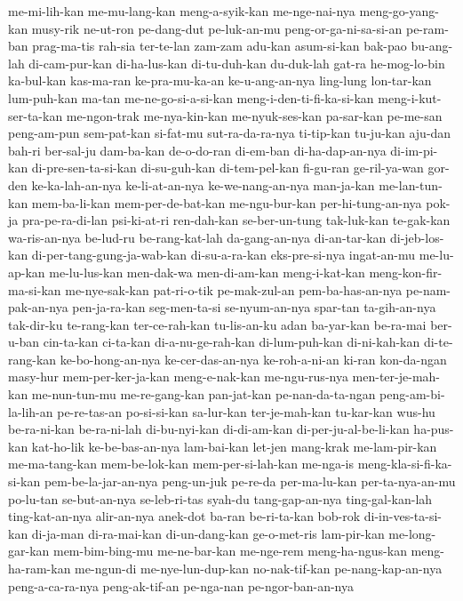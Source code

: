 {me-mi-lih-kan me-mu-lang-kan meng-a-syik-kan me-nge-nai-nya meng-go-yang-kan musy-rik ne-ut-ron pe-dang-dut
pe-luk-an-mu peng-or-ga-ni-sa-si-an pe-ram-ban prag-ma-tis rah-sia ter-te-lan zam-zam adu-kan
asum-si-kan bak-pao bu-ang-lah di-cam-pur-kan di-ha-lus-kan di-tu-duh-kan du-duk-lah gat-ra
he-mog-lo-bin ka-bul-kan kas-ma-ran ke-pra-mu-ka-an ke-u-ang-an-nya ling-lung lon-tar-kan lum-puh-kan
ma-tan me-ne-go-si-a-si-kan meng-i-den-ti-fi-ka-si-kan meng-i-kut-ser-ta-kan me-ngon-trak me-nya-kin-kan me-nyuk-ses-kan pa-sar-kan
pe-me-san peng-am-pun sem-pat-kan si-fat-mu sut-ra-da-ra-nya ti-tip-kan tu-ju-kan aju-dan
bah-ri ber-sal-ju dam-ba-kan de-o-do-ran di-em-ban di-ha-dap-an-nya di-im-pi-kan di-pre-sen-ta-si-kan
di-su-guh-kan di-tem-pel-kan fi-gu-ran ge-ril-ya-wan gor-den ke-ka-lah-an-nya ke-li-at-an-nya ke-we-nang-an-nya
man-ja-kan me-lan-tun-kan mem-ba-li-kan mem-per-de-bat-kan me-ngu-bur-kan per-hi-tung-an-nya pok-ja pra-pe-ra-di-lan
psi-ki-at-ri ren-dah-kan se-ber-un-tung tak-luk-kan te-gak-kan wa-ris-an-nya be-lud-ru be-rang-kat-lah
da-gang-an-nya di-an-tar-kan di-jeb-los-kan di-per-tang-gung-ja-wab-kan di-su-a-ra-kan eks-pre-si-nya ingat-an-mu me-lu-ap-kan
me-lu-lus-kan men-dak-wa men-di-am-kan meng-i-kat-kan meng-kon-fir-ma-si-kan me-nye-sak-kan pat-ri-o-tik pe-mak-zul-an
pem-ba-has-an-nya pe-nam-pak-an-nya pen-ja-ra-kan seg-men-ta-si se-nyum-an-nya spar-tan ta-gih-an-nya tak-dir-ku
te-rang-kan ter-ce-rah-kan tu-lis-an-ku adan ba-yar-kan be-ra-mai ber-u-ban cin-ta-kan
ci-ta-kan di-a-nu-ge-rah-kan di-lum-puh-kan di-ni-kah-kan di-te-rang-kan ke-bo-hong-an-nya ke-cer-das-an-nya ke-roh-a-ni-an
ki-ran kon-da-ngan masy-hur mem-per-ker-ja-kan meng-e-nak-kan me-ngu-rus-nya men-ter-je-mah-kan me-nun-tun-mu
me-re-gang-kan pan-jat-kan pe-nan-da-ta-ngan peng-am-bi-la-lih-an pe-re-tas-an po-si-si-kan sa-lur-kan ter-je-mah-kan
tu-kar-kan wus-hu be-ra-ni-kan be-ra-ni-lah di-bu-nyi-kan di-di-am-kan di-per-ju-al-be-li-kan ha-pus-kan
kat-ho-lik ke-be-bas-an-nya lam-bai-kan let-jen mang-krak me-lam-pir-kan me-ma-tang-kan mem-be-lok-kan
mem-per-si-lah-kan me-nga-is meng-kla-si-fi-ka-si-kan pem-be-la-jar-an-nya peng-un-juk pe-re-da per-ma-lu-kan per-ta-nya-an-mu
po-lu-tan se-but-an-nya se-leb-ri-tas syah-du tang-gap-an-nya ting-gal-kan-lah ting-kat-an-nya alir-an-nya
anek-dot ba-ran be-ri-ta-kan bob-rok di-in-ves-ta-si-kan di-ja-man di-ra-mai-kan di-un-dang-kan
ge-o-met-ris lam-pir-kan me-long-gar-kan mem-bim-bing-mu me-ne-bar-kan me-nge-rem meng-ha-ngus-kan meng-ha-ram-kan
me-ngun-di me-nye-lun-dup-kan no-nak-tif-kan pe-nang-kap-an-nya peng-a-ca-ra-nya peng-ak-tif-an pe-nga-nan pe-ngor-ban-an-nya
}
